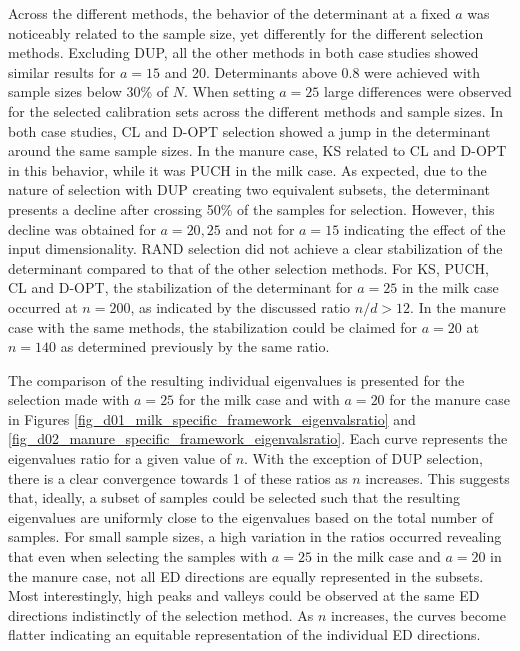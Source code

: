 \documentclass[journal=ancham,manuscript=article]{achemso}
\begin{document}
Across the different methods, the behavior of the determinant at a fixed $a$ was noticeably related to the sample size, yet differently for the different selection methods. Excluding DUP, all the other methods in both case studies showed similar results for $a=15$ and 20. Determinants above 0.8 were achieved with sample sizes below 30\% of $N$. When setting $a=25$ large differences were observed for the selected calibration sets across the different methods and sample sizes. In both case studies, CL and D-OPT selection showed a jump in the determinant around the same sample sizes. In the manure case, KS related to CL and D-OPT in this behavior, while it was PUCH in the milk case. As expected, due to the nature of selection with DUP creating two equivalent subsets, the determinant presents a decline after crossing 50\% of the samples for selection. However, this decline was obtained for $a=20, 25$ and not for $a=15$ indicating the effect of the input dimensionality. RAND selection did not achieve a clear stabilization of the determinant compared to that of the other selection methods. For KS, PUCH, CL and D-OPT, the stabilization of the determinant for $a=25$ in the milk case occurred at $n=200$, as indicated by the discussed ratio $n/d>12$. In the manure case with the same methods, the stabilization could be claimed for $a=20$ at $n=140$ as determined previously by the same ratio. 

The comparison of the resulting individual eigenvalues is presented for the selection made with $a = 25$ for the milk case and with $a=20$ for the manure case in Figures \ref{fig_d01_milk_specific_framework_eigenvalsratio} and \ref{fig_d02_manure_specific_framework_eigenvalsratio}. Each curve represents the eigenvalues ratio for a given value of $n$. With the exception of DUP selection, there is a clear convergence towards 1 of these ratios as $n$ increases. This suggests that, ideally, a subset of samples could be selected such that the resulting eigenvalues are uniformly close to the eigenvalues based on the total number of samples. For small sample sizes, a high variation in the ratios occurred revealing that even when selecting the samples with $a=25$ in the milk case and $a=20$ in the manure case, not all ED directions are equally represented in the subsets. Most interestingly, high peaks and valleys could be observed at the same ED directions indistinctly of the selection method. As $n$ increases, the curves become flatter indicating an equitable representation of the individual ED directions. 
\end{document}

